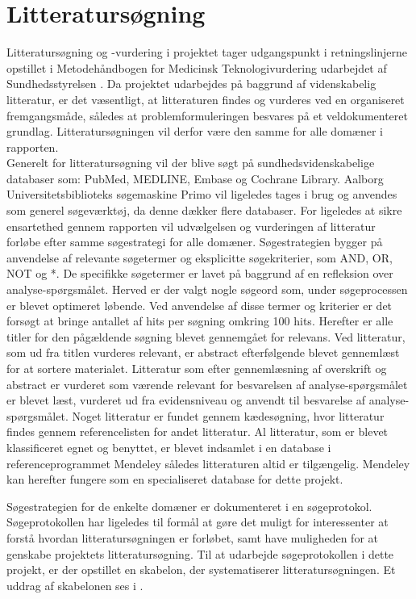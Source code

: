 \section{Litteratursøgning} \label{litteratursogning}
Litteratursøgning og -vurdering i projektet tager udgangspunkt i retningslinjerne opstillet i Metodehåndbogen for Medicinsk Teknologivurdering udarbejdet af Sundhedsstyrelsen \citep{metodehaandbogen}. Da projektet udarbejdes på baggrund af videnskabelig litteratur, er det væsentligt, at litteraturen findes og vurderes ved en organiseret fremgangsmåde, således at problemformuleringen besvares på et veldokumenteret grundlag. Litteratursøgningen vil derfor være den samme for alle domæner i rapporten. \\
Generelt for litteratursøgning vil der blive søgt på sundhedsvidenskabelige databaser som: PubMed, MEDLINE, Embase og Cochrane Library. Aalborg Universitetsbiblioteks søgemaskine Primo vil ligeledes tages i brug og anvendes som generel søgeværktøj, da denne dækker flere databaser. For ligeledes at sikre ensartethed gennem rapporten vil udvælgelsen og vurderingen af litteratur forløbe efter samme søgestrategi for alle domæner. Søgestrategien bygger på anvendelse af relevante søgetermer og eksplicitte søgekriterier, som AND, OR, NOT og *. De specifikke søgetermer er lavet på baggrund af en refleksion over analyse-spørgsmålet. Herved er der valgt nogle søgeord som, under søgeprocessen er blevet optimeret løbende. Ved anvendelse af disse termer og kriterier er det forsøgt at bringe antallet af hits per søgning omkring 100 hits. Herefter er alle titler for den pågældende søgning blevet gennemgået for relevans. Ved litteratur, som ud fra titlen vurderes relevant, er abstract efterfølgende blevet gennemlæst for at sortere materialet. Litteratur som efter gennemlæsning af overskrift og abstract er vurderet som værende relevant for besvarelsen af analyse-spørgsmålet er blevet læst, vurderet ud fra evidensniveau og anvendt til besvarelse af analyse-spørgsmålet. Noget litteratur er fundet gennem kædesøgning, hvor litteratur findes gennem referencelisten for andet litteratur. Al litteratur, som er blevet klassificeret egnet og benyttet, er blevet indsamlet i en database i referenceprogrammet Mendeley således litteraturen altid er tilgængelig. Mendeley kan herefter fungere som en specialiseret database for dette projekt.

Søgestrategien for de enkelte domæner er dokumenteret i en søgeprotokol. Søgeprotokollen har ligeledes til formål at gøre det muligt for interessenter at forstå hvordan litteratursøgningen er forløbet, samt have muligheden for at genskabe projektets litteratursøgning. \citep{metodehaandbogen} Til at udarbejde søgeprotokollen i dette projekt, er der opstillet en skabelon, der systematiserer litteratursøgningen. Et uddrag af skabelonen ses i .

